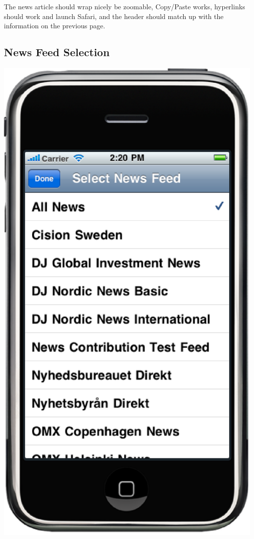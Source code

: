 \documentclass[12pt,twoside,letterpaper]{report}
\begin{document}
The news article should wrap nicely be zoomable, Copy/Paste works, hyperlinks should work and launch Safari, and the header should match up with the information on the previous page.

\subsection*{News Feed Selection}
\includegraphics[scale=0.5]{newsFeedSelection}
\end{document}
